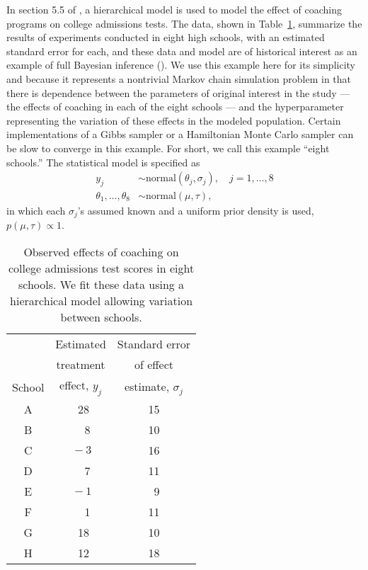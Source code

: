 \documentclass[12pt]{article}
\begin{document}
              In section 5.5 of \cite{GelmanCarlinSternRubin:2003}, a hierarchical model is
              used to model the effect of coaching programs on college admissions 
              tests.  The data, shown in Table~\ref{tab08schoolsdata}, summarize the results
              of experiments conducted in eight high schools, with an estimated standard 
              error for each, and these data and model are of historical interest as an example
              of full Bayesian inference (\citealt{Rubin1981}). 
              We use this example here for its simplicity and because it represents a nontrivial
              Markov chain simulation problem in that there is dependence between the parameters 
              of original interest in the study --- the effects of coaching in each of the eight 
              schools --- and the hyperparameter representing the variation of these effects in the 
              modeled population.  Certain implementations of a Gibbs sampler or a Hamiltonian 
              Monte Carlo sampler can be slow to converge in this example. 
              For short, we call this example ``eight schools.'' 
              The statistical model is specified as 
              \begin{align}
              y_j &\sim \text{normal}(\theta_j, \sigma_j), \quad j=1,\ldots,8 \\ 
              \theta_1, \ldots, \theta_8 &\sim \text{normal}(\mu, \tau), 
              \end{align} 
              in which each $\sigma_j$'s assumed known and a uniform prior 
              density is used, $p(\mu, \tau) \propto 1$. 
              
              \begin{table}
              \begin{center}\begin{tabular}{ccc}
              &\multicolumn{1}{c}{Estimated}&\multicolumn{1}{c}{Standard error}\\
              &\multicolumn{1}{c}{treatment}&\multicolumn{1}{c}{of effect}\\
              School&\multicolumn{1}{c}{effect, $y_j$}&
                \multicolumn{1}{c}{estimate, $\sigma_j$}\\\hline
              A& \ 28 & 15 \\
              B& \ \,\, 8 & 10 \\
              C& $\,-3$ & 16 \\
              D& \ \,\, 7 & 11 \\
              E& $\,-1$ & \ 9 \\
              F& \ \,\, 1 & 11 \\
              G& \ 18 & 10 \\
              H& \ 12 & 18
              \end{tabular}
              \end{center}
              \caption{Observed effects of coaching on college admissions test scores in
                eight schools.  We fit these data using a hierarchical model allowing variation
                between schools.}
              \label{tab08schoolsdata}
              \end{table}
              
\end{document}
